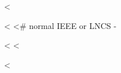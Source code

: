 
<%
\usepackage[%
  square,        %
  comma,         %
  numbers,       %
  sort           %
]{natbib}
<%
<# normal IEEE or LNCS -%
\usepackage[%
  square,        %
  comma,         %
  numbers,       %
  sort&compress %
]{natbib}
\fi
<%
<%

\renewcommand{\bibnumfmt}[1]{#1.}
<%
